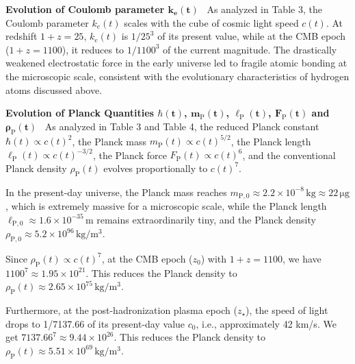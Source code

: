 \documentclass[12pt,leqno]{article}
\begin{document}
	
	\medskip
	\bigskip
	\textbf{Evolution of Coulomb parameter $\boldsymbol{k_e(t)}$}\,\,\,
	As analyzed in Table 3, the Coulomb parameter $k_e(t)$ scales with the cube of cosmic light speed $c(t)$. At redshift $1+z=25$, $k_e(t)$ is $1/25^3$ of its present value, while at the CMB epoch ($1+z=1100$), it reduces to $1/1100^3$ of the current magnitude. The drastically weakened electrostatic force in the early universe led to fragile atomic bonding at the microscopic scale, consistent with the evolutionary characteristics of hydrogen atoms discussed above.
	
	
	\medskip
	\bigskip
	\textbf{Evolution of Planck Quantities $\boldsymbol{\hbar(t)}$, $\boldsymbol{m_{\scriptscriptstyle\mathrm{P}}(t)}$, $\boldsymbol{\ell_{\scriptscriptstyle\mathrm{P}}(t)}$, $\boldsymbol{F_{\scriptscriptstyle\mathrm{P}}(t)}$ and $\boldsymbol{\rho_{\scriptscriptstyle\mathrm{P}}(t)}$}\,\,\,
	As analyzed in Table 3 and Table 4, the reduced Planck constant $\hbar(t) \propto c(t)^{2}$, the Planck mass $m_{\scriptscriptstyle\mathrm{P}}(t) \propto c(t)^{5/2}$, the Planck length $\ell_{\scriptscriptstyle\mathrm{P}}(t)\propto c(t)^{-3/2}$, the Planck force $F_{\scriptscriptstyle\mathrm{P}}(t)\propto c(t)^{6}$, and the conventional Planck density $\rho_{\scriptscriptstyle\mathrm{P}}(t)$ evolves proportionally to $c(t)^7$.
	
	\medskip
	In the present-day universe, the Planck mass reaches $m_{\scriptscriptstyle\mathrm{P,0}} \approx 2.2\times 10^{-8}\,\mathrm{kg} \approx 22\, \mathrm{\mu g}$, which is extremely massive for a microscopic scale, while the Planck length $\ell_{\scriptscriptstyle\mathrm{P},0} \approx 1.6\times 10^{-35}\,\mathrm{m}$ remains extraordinarily tiny, and the Planck density $\rho_{\scriptscriptstyle\mathrm{P},0} \approx 5.2\times 10^{96}\,\mathrm{kg/m^3}$.
	
	\medskip
	Since $\rho_{\scriptscriptstyle\mathrm{P}}(t) \propto c(t)^7$, at the CMB epoch (${z_0}$) with $1+z=1100$, we have $1100^7 \approx 1.95 \times 10^{21}$. This reduces the Planck density to $\rho_{\scriptscriptstyle\mathrm{P}}(t) \approx 2.65\times 10^{75}\,\mathrm{kg/m^3}$. 
	
	\medskip
	Furthermore, at the post-hadronization plasma epoch (${z_{\star}}$), the speed of light drops to 1/7137.66 of its present-day value $c_0$, i.e., approximately 42 km/s. We get $7137.66^7 \approx 9.44 \times 10^{26}$. This reduces the Planck density to $\rho_{\scriptscriptstyle\mathrm{P}}(t) \approx 5.51\times 10^{69}\,\mathrm{kg/m^3}$.
		
\end{document}
